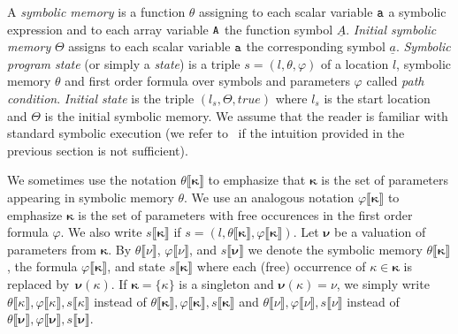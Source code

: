 \documentclass{sig-alternate}%
\newcommand{\true}{\ensuremath{\mathit{true}}}
\newcommand{\var}[1]{{\tt #1}}
\newcommand{\sym}[1]{\ensuremath{\underline{#1}}}
\newcommand{\prm}[1]{\ensuremath{\llbracket #1 \rrbracket}}
\newcommand{\bld}[1]{\ensuremath{\boldsymbol{#1}}}
\begin{document}

A \emph{symbolic memory} is a function $\theta$ assigning to each scalar
variable $\var{a}$ a symbolic expression and to each array variable
$\var{A}$ the function symbol $\sym{A}$. \emph{Initial symbolic memory}
$\Theta$ assigns to each scalar variable $\var{a}$ the corresponding symbol
$\sym{a}$.
\emph{Symbolic program state} (or simply a \emph{state}) is a triple
$s=(l,\theta,\varphi)$ of a location $l$, symbolic memory $\theta$ and first
order formula over symbols and parameters $\varphi$ called \emph{path
  condition}. \emph{Initial state} is the triple $(l_s,\Theta,\true)$ where
$l_s$ is the start location and $\Theta$ is the initial symbolic memory. We
assume that the reader is familiar with standard symbolic execution (we
refer to~\cite{Kin76} if the intuition provided in the previous section is
not sufficient).

We sometimes use the notation $\theta\prm{\bld{\kappa}}$ to emphasize that
$\bld{\kappa}$ is the set of parameters appearing in symbolic memory
$\theta$. We use an analogous notation $\varphi\prm{\bld{\kappa}}$ to
emphasize $\bld{\kappa}$ is the set of parameters with free occurences in
the first order formula $\varphi$. We also write $s\prm{\bld{\kappa}}$ if
$s=(l,\theta\prm{\bld{\kappa}},\varphi\prm{\bld{\kappa}})$. Let $\bld{\nu}$
be a valuation of parameters from $\bld{\kappa}$. By $\theta\prm{\nu}$,
$\varphi\prm{\nu}$, and $s\prm{\bld{\nu}}$ we denote the symbolic memory
$\theta\prm{\bld{\kappa}}$, the formula $\varphi\prm{\bld{\kappa}}$, and
state $s\prm{\bld{\kappa}}$ where each (free) occurrence of
$\kappa\in\bld{\kappa}$ is replaced by~$\bld{\nu}(\kappa)$. If
$\bld{\kappa}=\{\kappa\}$ is a singleton and $\bld{\nu}(\kappa)=\nu$, we
simply write $\theta\prm{\kappa},\varphi\prm{\kappa},s\prm{\kappa}$ instead
of $\theta\prm{\bld{\kappa}},\varphi\prm{\bld{\kappa}},s\prm{\bld{\kappa}}$
and $\theta\prm{\nu},\varphi\prm{\nu},s\prm{\nu}$ instead of
$\theta\prm{\bld{\nu}},\varphi\prm{\bld{\nu}},s\prm{\bld{\nu}}$.
 
\end{document}
